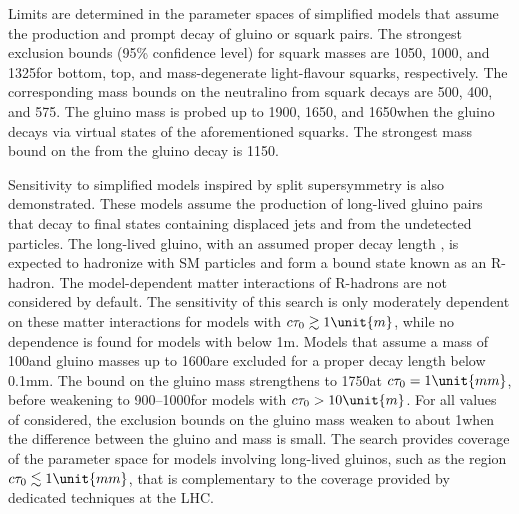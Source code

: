 Limits are determined in the parameter spaces of simplified models
that assume the production and prompt decay of gluino or squark
pairs. The strongest exclusion bounds (95\% confidence level) for
squark masses are 1050, 1000, and 1325\GeV for bottom, top, and
mass-degenerate light-flavour squarks, respectively. The corresponding
mass bounds on the neutralino \PSGczDo from squark decays are 500,
400, and 575\GeV. The gluino mass is probed up to 1900, 1650, and
1650\GeV when the gluino decays via virtual states of the
aforementioned squarks. The strongest mass bound on the \PSGczDo from
the gluino decay is 1150\GeV.

Sensitivity to simplified models inspired by split supersymmetry is
also demonstrated. These models assume the production of long-lived
gluino pairs that decay to final states containing displaced jets and
\ptvecmiss from the undetected \PSGczDo particles. The long-lived
gluino, with an assumed proper decay length \ctau, is expected to
hadronize with SM particles and form a bound state known as an
R-hadron. The model-dependent matter interactions of R-hadrons are not
considered by default. The sensitivity of this search is only
moderately dependent on these matter interactions for models with
$\ctau \gtrsim 1\unit{m}$, while no dependence is found for models
with \ctau below 1\unit{m}. Models that assume a \PSGczDo mass of
100\GeV and gluino masses up to 1600\GeV are excluded for a proper
decay length \ctau below 0.1\unit{mm}. The bound on the gluino mass
strengthens to 1750\GeV at $\ctau = 1\unit{mm}$, before weakening to
900--1000\GeV for models with $\ctau > 10\unit{m}$.  For all values of
\ctau considered, the exclusion bounds on the gluino mass weaken to
about 1\TeV when the difference between the gluino and \PSGczDo mass
is small. The search provides coverage of the \ctau parameter space
for models involving long-lived gluinos, such as the region $\ctau
\lesssim 1\unit{mm}$, that is complementary to the coverage provided
by dedicated techniques at the LHC.

